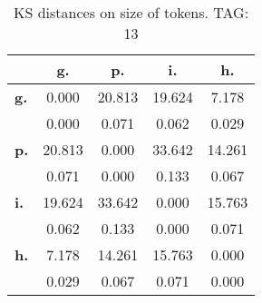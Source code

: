\begin{table}[h!]
\begin{center}
\begin{tabular}{| l || c | c | c | c |}\hline
 & {\bf g.} & {\bf p.} & {\bf i.} & {\bf h.} \\\hline\hline
{\bf g.} & 0.000 & 20.813 & 19.624 & 7.178 \\
{\bf } & 0.000 & 0.071 & 0.062 & 0.029 \\\hline
{\bf p.} & 20.813 & 0.000 & 33.642 & 14.261 \\
{\bf } & 0.071 & 0.000 & 0.133 & 0.067 \\\hline
{\bf i.} & 19.624 & 33.642 & 0.000 & 15.763 \\
{\bf } & 0.062 & 0.133 & 0.000 & 0.071 \\\hline
{\bf h.} & 7.178 & 14.261 & 15.763 & 0.000 \\
{\bf } & 0.029 & 0.067 & 0.071 & 0.000 \\\hline
\end{tabular}
\caption{KS distances on size of tokens. TAG: 13}
\end{center}
\end{table}
